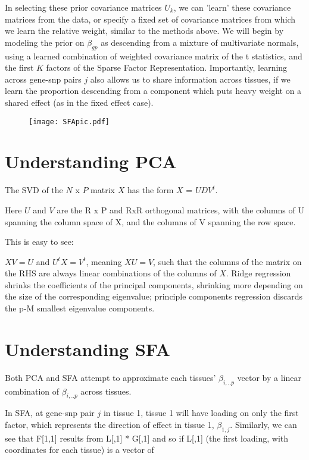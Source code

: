 \documentclass[10pt]{article}
\begin{document}
In selecting these prior covariance matrices $U_{k}$, we can 'learn' these covariance matrices from the data, or specify a fixed set of covariance matrices from which we learn the relative weight, similar to the methods above. We will begin by modeling the prior on $\beta_{gp}$ as descending from a mixture of multivariate normals, using a learned combination of weighted covariance matrix of the t statistics, and the first $K$ factors of the Sparse Factor Representation. Importantly, learning across gene-snp pairs $j$ also allows us to share information across tissues, if we learn the proportion descending from a component which puts heavy weight on a shared effect (as in the fixed effect case).




\begin{figure}[h]
    \texttt{[image: SFApic.pdf]}
\end{figure}
\section{Understanding PCA}

The SVD of the $N$ x $P$ matrix $X$ has the form $X$ = $UDV^{t}$.

Here $U$ and $V$ are the R x P and RxR orthogonal matrices, with the columns of U spanning the column space of X, and the columns of V spanning the row space.

This is easy to see:

$XV=U$ and $U^{t}X=V^{t}$, meaning $XU=V$, such that the columns of the matrix on the RHS are always linear combinations of the columns of $X$. Ridge regression shrinks the coefficients of the principal components, shrinking more depending on the size of the corresponding eigenvalue; principle components regression discards the p-M smallest eigenvalue components.


\section{Understanding SFA}

Both PCA and SFA attempt to approximate each tissues' $\beta_{i,..p}$ vector by a linear combination of $\beta_{i,..p}$ across tissues. 

In SFA, at gene-snp pair $j$ in tissue 1, tissue 1 will have loading on only the first factor, which represents the direction of effect in tissue 1, $\beta_{1,j}$. Similarly, we can see that F[1,1] results from L[,1] * G[,1] and so if L[,1] (the first loading, with coordinates for each tissue) is a vector of
\begin{pvector}
 [1 0 0 .. R]
 \end{pvector}
 
\end{document}
